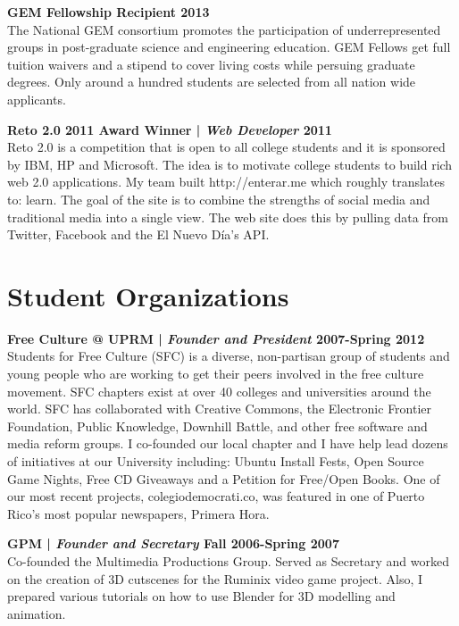 \documentclass[margin,line]{res}
\begin{document}
\begin{resume}
{\bf GEM Fellowship Recipient \hfill {\bf 2013 \\} }
\vspace{-.01cm}
The National GEM consortium promotes the participation of underrepresented groups in post-graduate science and engineering education. GEM Fellows get full tuition waivers and a stipend to cover living costs while persuing graduate degrees. Only around a hundred students are selected from all nation wide applicants.

{\bf Reto 2.0 2011 Award Winner | {\em Web Developer} \hfill {\bf 2011 \\} }
\vspace{-.01cm}
Reto 2.0 is a competition that is open to all college students and it is sponsored by IBM, HP and Microsoft. The idea is to motivate college students to build rich web 2.0 applications. My team built http://enterar.me which roughly translates to: learn. The goal of the site is to combine the strengths of social media and traditional media into a single view. The web site does this by pulling data from Twitter, Facebook and the El Nuevo Día's API.

\section{\sc Student Organizations}

{\bf Free Culture @ UPRM | {\em Founder and President} \hfill {\bf 2007-Spring 2012 \\} }
\vspace{-.01cm}
Students for Free Culture (SFC) is a diverse, non-partisan group of students and young people who are working to get their peers involved in the free culture movement. SFC chapters exist at over 40 colleges and universities around the world. SFC has collaborated with Creative Commons, the Electronic Frontier Foundation, Public Knowledge, Downhill Battle, and other free software and media reform groups. I co-founded our local chapter and I have help lead dozens of initiatives at our University including: Ubuntu Install Fests, Open Source Game Nights, Free CD Giveaways and a Petition for Free/Open Books. One of our most recent projects, colegiodemocrati.co, was featured in one of Puerto Rico's most popular newspapers, Primera Hora.

{\bf GPM | {\em Founder and Secretary} \hfill {\bf Fall 2006-Spring 2007 \\} }
\vspace{-.01cm}
Co-founded the Multimedia Productions Group. Served as Secretary and worked on the creation of 3D cutscenes for the Ruminix video game project. Also, I prepared various tutorials on how to use Blender for 3D modelling and animation.


\end{resume}
\end{document}
